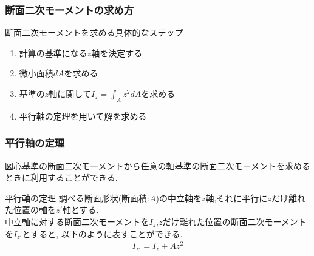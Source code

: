 \documentclass[a4paper]{jsarticle}
\begin{document}
\subsubsection{断面二次モーメントの求め方}
\begin{itembox}[l]{断面二次モーメントを求める具体的なステップ}
    \begin{enumerate}[(1)]
        \item 計算の基準になる$z$軸を決定する
        \item 微小面積$dA$を求める
        \item 基準の$z$軸に関して$I_z=\int_Az^2dA$を求める
        \item 平行軸の定理を用いて解を求める
    \end{enumerate}
\end{itembox}
\subsubsection{平行軸の定理}
図心基準の断面二次モーメントから任意の軸基準の断面二次モーメントを求めるときに利用することができる.
\begin{itembox}[l]{平行軸の定理}
    調べる断面形状(断面積:$A$)の中立軸を$z$軸,それに平行に$z$だけ離れた位置の軸を$z'$軸とする.\\
    中立軸に対する断面二次モーメントを$I_z$,$z$だけ離れた位置の断面二次モーメントを$I_{z'}$とすると,
    以下のように表すことができる.
    \begin{eqnarray*}
        I_{z'}=I_z+Az^2\\
    \end{eqnarray*}
\end{itembox}
\end{document}
